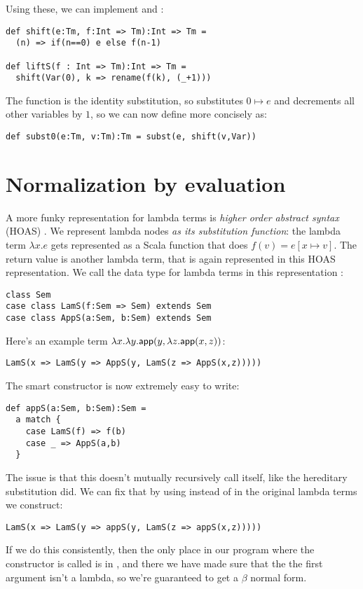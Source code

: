 Using these, we can implement  and :

\begin{lstlisting}
def shift(e:Tm, f:Int => Tm):Int => Tm =
  (n) => if(n==0) e else f(n-1)

def liftS(f : Int => Tm):Int => Tm =
  shift(Var(0), k => rename(f(k), (_+1)))
\end{lstlisting}

The function  is the identity substitution, so  substitutes $0 \mapsto e$ and decrements all other variables by $1$, so we can now define  more concisely as:

\begin{lstlisting}
def subst0(e:Tm, v:Tm):Tm = subst(e, shift(v,Var))
\end{lstlisting}

\section{Normalization by evaluation}

A more funky representation for lambda terms is \emph{higher order abstract syntax} (HOAS) \cite{pfenning88}.
We represent lambda nodes \emph{as its substitution function}: the lambda term $\lambda x. e$ gets represented as a Scala function that does $f(v) = e[x \mapsto v]$.
The return value is another lambda term, that is again represented in this HOAS representation.
We call the data type for lambda terms in this representation :

\begin{lstlisting}
class Sem
case class LamS(f:Sem => Sem) extends Sem
case class AppS(a:Sem, b:Sem) extends Sem
\end{lstlisting}

Here's an example term $\lambda x. \lambda y. \mathsf{app}(y, \lambda z. \mathsf{app}(x,z))$:
\begin{lstlisting}
LamS(x => LamS(y => AppS(y, LamS(z => AppS(x,z)))))
\end{lstlisting}

The smart constructor  is now extremely easy to write:
\begin{lstlisting}
def appS(a:Sem, b:Sem):Sem =
  a match {
    case LamS(f) => f(b)
    case _ => AppS(a,b)
  }
\end{lstlisting}

The issue is that this doesn't mutually recursively call itself, like the hereditary substitution did.
We can fix that by using  instead of  in the original lambda terms we construct:
\begin{lstlisting}
LamS(x => LamS(y => appS(y, LamS(z => appS(x,z)))))
\end{lstlisting}
If we do this consistently, then the only place in our program where the constructor  is called is in , and there we have made sure that the the first argument isn't a lambda, so we're guaranteed to get a $\beta$ normal form.

